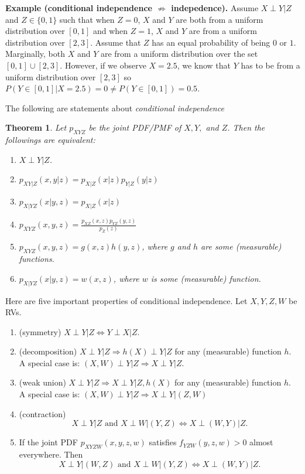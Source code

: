 \documentclass[twoside]{article}
\newcounter{lecnum}
\newtheorem{theorem}{Theorem}[lecnum]
\begin{document}
{\bf Example (conditional independence $\not \Rightarrow$ indepedence).}
Assume $X\perp Y|Z$ and $Z\in\{0,1\}$ such that when $Z=0$, $X$ and $Y$ are both from a uniform distribution over $[0,1]$
and when $Z=1$, $X$ and $Y$ are from a uniform distribution over $[2,3].$
Assume that $Z$ has an equal probability of being $0 $ or $1$.
Marginally, both $X$ and $Y$ are from a uniform distribution over the set $[0,1]\cup [2,3]$.
However, if we observe $X=2.5$, we know that $Y$ has to be from a uniform distribution over $[2,3]$
so $P(Y\in[0,1]|X=2.5)= 0\neq P(Y\in[0,1])=0.5$. 

The following are statements about \emph{conditional independence}

\begin{theorem}
Let $p_{XYZ}$ be the joint PDF/PMF of $X,Y,$ and $Z$.
Then the followings are equivalent:
\begin{enumerate}
\item[(i)] $X\perp Y|Z$.
\item[(ii)] $p_{XY|Z}(x,y|z)= p_{X|Z}(x|z) p_{Y|Z}(y|z)$ 
\item[(iii)] $p_{X|YZ}(x|y,z)= p_{X|Z}(x|z) $ 
\item[(iv)] $p_{XYZ}(x,y,z)= \frac{p_{XZ}(x,z)p_{YZ}(y,z)}{p_Z(z)} $ 
\item[(v)] $p_{XYZ}(x,y,z)=  g(x,z) h(y,z)$, where $g$ and $h$ are some (measurable) functions.
\item[(vi)] $p_{X|YZ}(x|y,z)=  w(x,z) $, where $w$ is some (measurable) function.
\end{enumerate}
\label{thm::cid}
\end{theorem}

Here are five important properties of conditional independence. 
Let $X,Y,Z,W$ be RVs. 
\begin{enumerate}
\item[(C1)] (symmetry) $X\perp Y|Z\Longleftrightarrow Y\perp X|Z$.
\item[(C2)] (decomposition) $X \perp Y|Z\Longrightarrow h(X)\perp Y|Z$ for any (measurable) function $h$.\\
A special case is: $(X,W) \perp Y|Z\Longrightarrow X\perp Y|Z$. 
\item[(C3)] (weak union) $X\perp Y|Z\Longrightarrow X\perp Y|Z, h(X)$ for any (measurable) function $h$.\\
A special case is: $(X,W)\perp Y|Z \Longrightarrow X\perp Y|(Z,W)$
\item[(C4)] (contraction) 
$$
X\perp Y|Z\mbox{ and } X\perp W|(Y,Z)\Longleftrightarrow X\perp (W,Y)|Z.
$$
\item[(C5)] If the joint PDF $p_{XYZW}(x,y,z,w)$ satisfies $f_{YZW}(y,z,w)>0$ almost everywhere. 
Then
$$
X\perp Y|(W,Z) \mbox{ and } X\perp W|(Y,Z) \Longleftrightarrow X\perp (W,Y)|Z.
$$
\end{enumerate}
\end{document}
